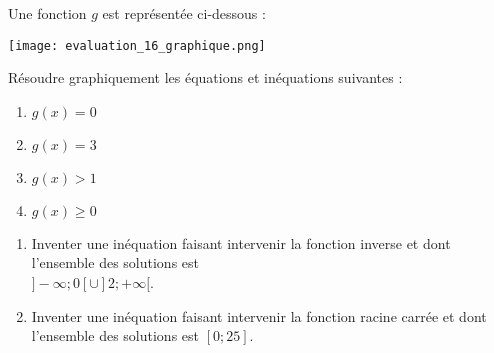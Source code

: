\documentclass[a4paper]{article}
\begin{document}
\dotfill{}

\bigskip

\exo[4 points] Une fonction $g$ est représentée ci-dessous :

\begin{center}
  \texttt{[image: evaluation\_16\_graphique.png]}
\end{center}

Résoudre graphiquement les équations et inéquations suivantes :
\smallskip
\begin{multicols}{4}
  \begin{enumerate}
    \item $g(x)=0$
    \item $g(x)=3$
    \item $g(x)>1$
    \item $g(x)\geq 0$
  \end{enumerate}
\end{multicols}

\dotfill{}

\bigskip

\exo[2 points] \vspace{-2mm}
\begin{enumerate}
  \item Inventer une inéquation faisant intervenir la fonction inverse et dont l'ensemble des solutions est \\$]-\infty;0[\cup]2;+\infty[$.
  \item Inventer une inéquation faisant intervenir la fonction racine carrée et dont l'ensemble des solutions est $[0;25]$.
\end{enumerate}
\end{document}
